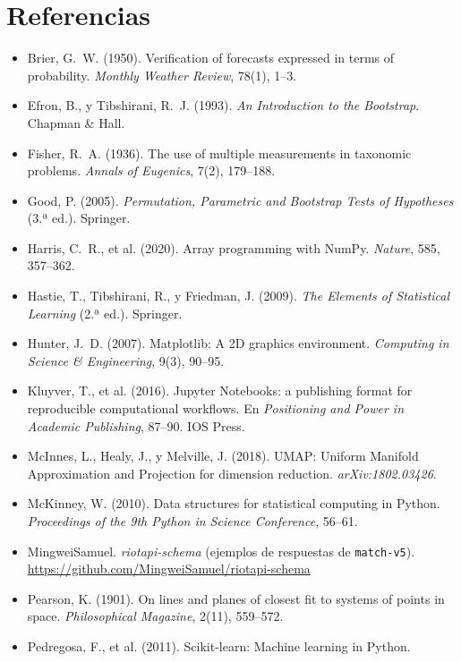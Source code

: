 \documentclass[11pt,letterpaper]{article}
\begin{document}
\section*{Referencias}
\begin{itemize}[leftmargin=1.4em,itemsep=.3em,label={}]
  \item Brier, G.~W. (1950). Verification of forecasts expressed in terms of probability.
        \emph{Monthly Weather Review}, 78(1), 1--3.
  \item Efron, B., y Tibshirani, R.~J. (1993). \emph{An Introduction to the
        Bootstrap}. Chapman \& Hall.
  \item Fisher, R.~A. (1936). The use of multiple measurements in taxonomic problems.
        \emph{Annals of Eugenics}, 7(2), 179--188.
  \item Good, P. (2005). \emph{Permutation, Parametric and Bootstrap Tests of
        Hypotheses} (3.ª ed.). Springer.
  \item Harris, C.~R., et al. (2020). Array programming with NumPy. \emph{Nature},
        585, 357--362.
  \item Hastie, T., Tibshirani, R., y Friedman, J. (2009). \emph{The Elements of
        Statistical Learning} (2.ª ed.). Springer.
  \item Hunter, J.~D. (2007). Matplotlib: A 2D graphics environment. \emph{Computing
        in Science \& Engineering}, 9(3), 90--95.
  \item Kluyver, T., et al. (2016). Jupyter Notebooks: a publishing format for
        reproducible computational workflows. En \emph{Positioning and Power in Academic
        Publishing}, 87--90. IOS Press.
  \item McInnes, L., Healy, J., y Melville, J. (2018). UMAP: Uniform Manifold
        Approximation and Projection for dimension reduction. \emph{arXiv:1802.03426}.
  \item McKinney, W. (2010). Data structures for statistical computing in Python.
        \emph{Proceedings of the 9th Python in Science Conference}, 56--61.
  \item MingweiSamuel. \emph{riotapi-schema} (ejemplos de respuestas de
        \texttt{match-v5}). \url{https://github.com/MingweiSamuel/riotapi-schema}
  \item Pearson, K. (1901). On lines and planes of closest fit to systems of points in
        space. \emph{Philosophical Magazine}, 2(11), 559--572.
  \item Pedregosa, F., et al. (2011). Scikit-learn: Machine learning in Python.

\end{itemize}
\end{document}
